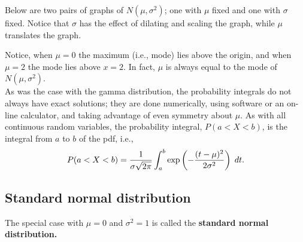 \noindent Below are two pairs of graphs of $N(\mu,\sigma^2)$; one with $\mu$ fixed and one with $\sigma$ fixed. Notice that $\sigma$ has the effect of dilating and scaling the graph, while $\mu$ translates the graph.
\begin{center}
\end{center}
\begin{center}
\end{center}
Notice, when $\mu = 0$ the maximum (i.e., mode) lies above the origin, and when $\mu = 2$ the mode lies above $x = 2$. In fact, $\mu$ is always equal to the mode of $N(\mu,\sigma^2)$. \\

\noindent As was the case with the gamma distribution, the probability integrals do not always have exact solutions; they are done numerically, using software or an on-line calculator, and taking advantage of even symmetry about $\mu$. As with all continuous random variables, the probability integral, $P(a < X < b)$, is the integral from $a$ to $b$ of the pdf, i.e., 
\[
P(a < X < b) = \frac{1}{\sigma \sqrt{2\pi}}\int_a^b \exp\left(-\frac{(t-\mu)^2}{2\sigma^2}\right) \; dt.
\]

\subsection{Standard normal distribution}  \label{standard normal distribution}
The special case with $\mu = 0$ and $\sigma^2 = 1$ is called the \textbf{standard normal distribution.} \\

